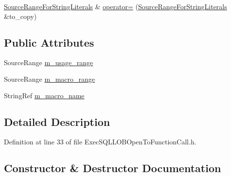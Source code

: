 \begin{DoxyCompactItemize}
\item 
\hyperlink{classclang_1_1tidy_1_1pagesjaunes_1_1_exec_s_q_l_l_o_b_open_to_function_call_1_1_source_range_for_string_literals}{Source\+Range\+For\+String\+Literals} \& \hyperlink{classclang_1_1tidy_1_1pagesjaunes_1_1_exec_s_q_l_l_o_b_open_to_function_call_1_1_source_range_for_string_literals_a7ff89a5f5ae4f548572d6dcb276fbbce}{operator=} (\hyperlink{classclang_1_1tidy_1_1pagesjaunes_1_1_exec_s_q_l_l_o_b_open_to_function_call_1_1_source_range_for_string_literals}{Source\+Range\+For\+String\+Literals} \&to\+\_\+copy)
\end{DoxyCompactItemize}
\subsection*{Public Attributes}
\begin{DoxyCompactItemize}
\item 
Source\+Range \hyperlink{classclang_1_1tidy_1_1pagesjaunes_1_1_exec_s_q_l_l_o_b_open_to_function_call_1_1_source_range_for_string_literals_a1f07d9769c9ed318712e88d4e500bd86}{m\+\_\+usage\+\_\+range}
\item 
Source\+Range \hyperlink{classclang_1_1tidy_1_1pagesjaunes_1_1_exec_s_q_l_l_o_b_open_to_function_call_1_1_source_range_for_string_literals_ab0bd620bf2aa1d1790874c8663b30601}{m\+\_\+macro\+\_\+range}
\item 
String\+Ref \hyperlink{classclang_1_1tidy_1_1pagesjaunes_1_1_exec_s_q_l_l_o_b_open_to_function_call_1_1_source_range_for_string_literals_a9817f6cedf3695400e6be48c3ecce99f}{m\+\_\+macro\+\_\+name}
\end{DoxyCompactItemize}


\subsection{Detailed Description}


Definition at line 33 of file Exec\+S\+Q\+L\+L\+O\+B\+Open\+To\+Function\+Call.\+h.



\subsection{Constructor \& Destructor Documentation}
\mbox{\label{classclang_1_1tidy_1_1pagesjaunes_1_1_exec_s_q_l_l_o_b_open_to_function_call_1_1_source_range_for_string_literals_ae09cb70010a8bfd1301156ae7c05df16}} 
